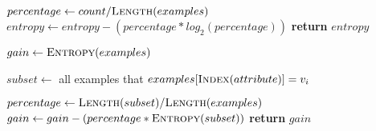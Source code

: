 \begin{algorithm}[t]
\begin{algorithmic}[1]
        \State $percentage \gets count / \textsc{Length}(examples)$
            \State $entropy \gets entropy - (percentage * log_2 (percentage))$
        \EndIf
    \EndFor
    \State \textbf{return} $entropy$
\EndProcedure

\begin{spacing}{0.5}
\end{spacing}

    \State $gain \gets \textsc{Entropy}(examples)$
    
        \State $subset \gets$ all examples that $examples[\textsc{Index}(attribute)] = v_i$
        
        \State $percentage \gets \textsc{Length}(subset) / \textsc{Length}(examples)$
            \State $gain \gets gain - (percentage * \textsc{Entropy}(subset))$
        \EndIf
    \EndFor
    \State \textbf{return} $gain$
\EndProcedure

\end{algorithmic}
\end{algorithm}


